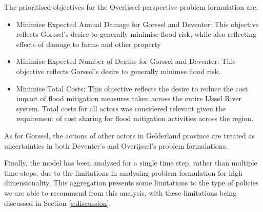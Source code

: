 The prioritised objectives for the Overijssel-perspective problem formulation are:
\begin{itemize}
    \item Minimise Expected Annual Damage for Gorssel and Deventer: This objective reflects Gorssel's desire to generally minimise flood risk, while also reflecting effects of damage to farms and other property
    \item Minimise Expected Number of Deaths for Gorssel and Deventer: This objective reflects Gorssel's desire to generally minimse flood risk.
    \item Minimise Total Costs: This objective reflects the desire to reduce the cost impact of flood mitigation measures taken across the entire IJssel River system. Total costs for all actors was considered relevant given the requirement of cost sharing for flood mitigation activities across the region.
\end{itemize}

As for Gorssel, the actions of other actors in Gelderland province are treated as uncertainties in both Deventer's and Overijssel's problem formulations.

Finally, the model has been analysed for a single time step, rather than multiple time steps, due to the limitations in analysing problem formulation for high dimensionality. This aggregation presents some limitations to the type of policies we are able to recommend from this analysis, with these limitations being discussed in Section \ref{s:discussion}.